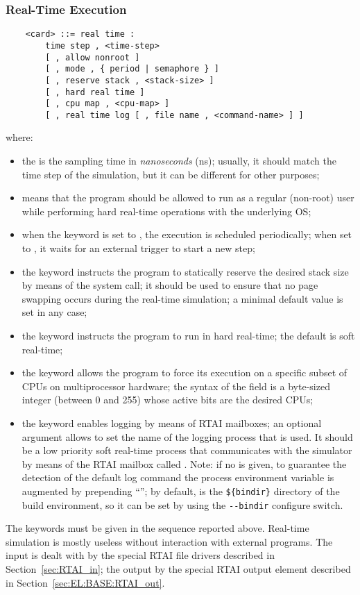 \subsubsection{Real-Time Execution}\label{sec:REAL-TIME}
\begin{verbatim}
    <card> ::= real time :
        time step , <time-step> 
        [ , allow nonroot ]
        [ , mode , { period | semaphore } ]
        [ , reserve stack , <stack-size> ]
        [ , hard real time ]
        [ , cpu map , <cpu-map> ]
        [ , real time log [ , file name , <command-name> ] ]
\end{verbatim}
where:
\begin{itemize}
\item the  is the sampling time in \emph{nanoseconds} (ns); 
usually, it should match the time step 
of the simulation, but it can be different for other purposes;
\item {} means that the program should be allowed to run
as a regular (non-root) user while performing hard real-time operations
with the underlying OS;
\item when the keyword  is set to , the execution
is scheduled periodically; when set to , it waits 
for an external trigger to start a new step;
\item the keyword  instructs the program 
to statically reserve the desired stack size by means 
of the  system call; it should be used to ensure 
that no page swapping occurs during the real-time simulation;
a minimal default value is set in any case;
\item the keyword  instructs the program to run
in hard real-time; the default is soft real-time;
\item the keyword  allows the program to force its
execution on a specific subset of CPUs on multiprocessor hardware;
the syntax of the  field is a byte-sized integer 
(between 0 and 255) whose active bits are the desired CPUs;
\item the keyword  enables logging by means 
of RTAI mailboxes; an optional  argument allows 
to set the name of the logging process that is used.
It should be a low priority soft real-time process that communicates
with the simulator by means of the RTAI mailbox called .
Note: if no  is given, to guarantee the detection 
of the default log command the process  environment variable 
is augmented by prepending ``''; by default,
 is the \verb;${bindir}; directory of the build environment,
so it can be set by using the \verb;--bindir; configure switch.
\end{itemize}
The keywords must be given in the sequence reported above.
Real-time simulation is mostly useless without interaction 
with external programs.
The input is dealt with by the special RTAI file drivers described
in Section~\ref{sec:RTAI_in}; the output by the special RTAI output
element described in Section~\ref{sec:EL:BASE:RTAI_out}.


